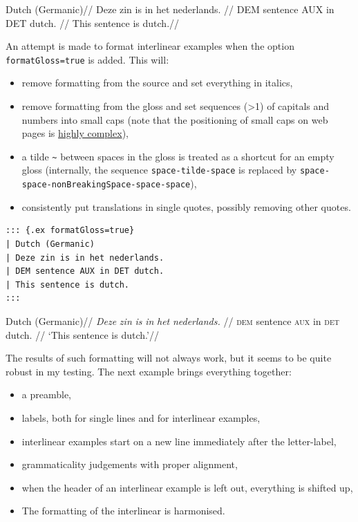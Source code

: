 \documentclass[
]{article}
\providecommand{\tightlist}{%
  \setlength{\itemsep}{0pt}\setlength{\parskip}{0pt}}
\begin{document}
\begin{samepage}
  \begingl
  \glpreamble Dutch (Germanic)//
  \gla Deze zin is in het nederlands. //
  \glb DEM sentence AUX in DET dutch. //
  \glft This sentence is dutch.//
  \endgl
\xe
\end{samepage}

An attempt is made to format interlinear examples when the option
\texttt{formatGloss=true} is added. This will:

\begin{itemize}
\tightlist
\item
  remove formatting from the source and set everything in italics,
\item
  remove formatting from the gloss and set sequences (\textgreater1) of
  capitals and numbers into small caps (note that the positioning of
  small caps on web pages is
  \href{https://iamvdo.me/en/blog/css-font-metrics-line-height-and-vertical-align}{highly
  complex}),
\item
  a tilde \texttt{\textasciitilde{}} between spaces in the gloss is
  treated as a shortcut for an empty gloss (internally, the sequence
  \texttt{space-tilde-space} is replaced by
  \texttt{space-space-nonBreakingSpace-space-space}),
\item
  consistently put translations in single quotes, possibly removing
  other quotes.
\end{itemize}

\begin{verbatim}
::: {.ex formatGloss=true}
| Dutch (Germanic)
| Deze zin is in het nederlands.
| DEM sentence AUX in DET dutch.
| This sentence is dutch.
:::
\end{verbatim}

\begin{samepage}
  \begingl
  \glpreamble Dutch (Germanic)//
  \gla \emph{Deze} \emph{zin} \emph{is} \emph{in} \emph{het}
\emph{nederlands.} //
  \glb \textsc{dem} sentence \textsc{aux} in \textsc{det} dutch. //
  \glft `This sentence is dutch.'//
  \endgl
\xe
\end{samepage}

The results of such formatting will not always work, but it seems to be
quite robust in my testing. The next example brings everything together:

\begin{itemize}
\tightlist
\item
  a preamble,
\item
  labels, both for single lines and for interlinear examples,
\item
  interlinear examples start on a new line immediately after the
  letter-label,
\item
  grammaticality judgements with proper alignment,
\item
  when the header of an interlinear example is left out, everything is
  shifted up,
\item
  The formatting of the interlinear is harmonised.
\end{itemize}
\end{document}
